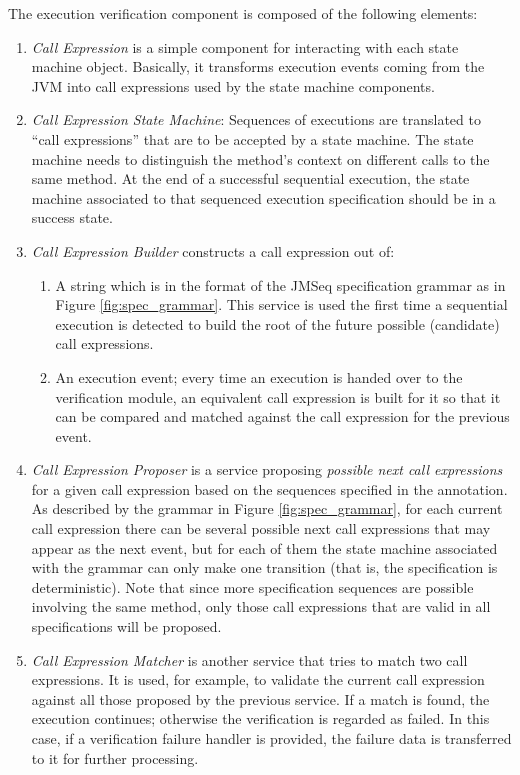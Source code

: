 The execution verification component is composed of the following elements:
\begin{enumerate}
  \item \textsl{Call Expression} is a simple component for interacting with each
  state machine object. Basically, it transforms execution events coming from
  the JVM into call expressions used by the state machine components.
  \item \textsl{Call Expression State Machine}: Sequences of
  executions are translated to ``call expressions'' that are to be accepted by
  a state machine. The state machine needs to distinguish the
  method's context on different calls to the same method. At the
  end of a successful sequential execution, the state machine associated to that
  sequenced execution specification should be in a success state. 
  \item \textsl{Call Expression Builder} constructs a call expression out of:
  \begin{enumerate}
    \item A string which is in the format of the JMSeq specification grammar as
    in Figure \ref{fig:spec_grammar}. This service is used the first time a
    sequential execution is detected to build the root of the future possible
    (candidate) call expressions.
    \item An execution event; every time an execution is handed over to the
    verification module, an equivalent  call expression is built for it so
    that it can be compared and matched against the call expression for the
    previous event.
  \end{enumerate}
  \item \textsl{Call Expression Proposer} is a service proposing \textit{possible
  next call expressions} for a given call expression based on the sequences specified
  in the annotation. As described by the grammar in Figure
  \ref{fig:spec_grammar}, for each current call expression there can
  be several possible next call expressions that may appear as the next event, but for
  each of them the state machine associated with the grammar can only make one
  transition (that is, the specification is deterministic). Note that since more specification sequences are possible involving
  the same method, only those call expressions that are valid in all
  specifications will be proposed.
  \item \textsl{Call Expression Matcher} is another service that
  tries to match two call expressions. It is used, for example, to validate
  the current call expression against all those proposed by the previous service.
  If a match is found, the execution continues; otherwise the verification is regarded as
  failed. In this case, if a verification failure handler is provided, the failure data is
  transferred to it for further processing.
\end{enumerate}

